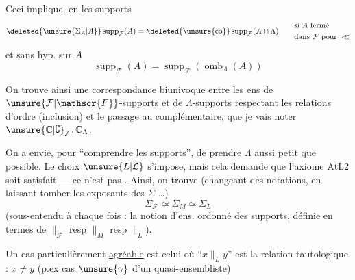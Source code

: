 Ceci implique, en  les supports
\[
\deleted{\unsure{\Sigma_A|A}}\operatorname{supp}_{\mathcal{F}}(A)=\deleted{\unsure{\mathrm{co}}}\operatorname{supp}_{\mathcal{F}}(A\cap\Lambda)
\qquad\begin{aligned}&\text{si }A\text{ fermé}\\&\text{dans }\mathcal{F}\text{ pour }\ll\end{aligned}
\]
et sans hyp. sur $A$
\[
\operatorname{supp}_{\mathcal{F}}(A)=\operatorname{supp}_{\mathcal{F}}(\operatorname{omb}_\Lambda(A))
\]


On trouve ainsi une correspondance biunivoque entre les ens de $\unsure{\mathcal{F}|\mathscr{F}}$-supports et de $\Lambda$-supports
respectant les relations d'ordre (inclusion) et le passage au complémentaire, que je vais noter $\unsure{\mathbb{C}|\complement}_{\mathcal{F}},\mathbb{C}_\Lambda$.

On a envie, pour ``comprendre les supports'', de prendre $\Lambda$ aussi petit que possible. Le choix $\unsure{L|\mathcal{L}}$ s'impose, mais cela demande que l'axiome $\mathrm{AtL2}$ soit satisfait --- ce n'est pas . Ainsi, on trouve (changeant des notations, en laissant tomber les exposants des $\Sigma$ \dots)
\[
\Sigma_{\mathcal{F}}\simeq\Sigma_M\simeq\Sigma_L
\]
(sous-entendu à chaque fois : la notion d'ens. ordonné des supports, définie en termes de $\parallel_{\mathcal{F}}$ resp $\parallel_M$ resp $\parallel_L$).

Un cas particulièrement \uline{agréable} est celui où ``$x\parallel_L y$'' est la relation tautologique : $x\ne y$ (p.ex cas $\unsure{\gamma}$ d'un  quasi-ensembliste)

